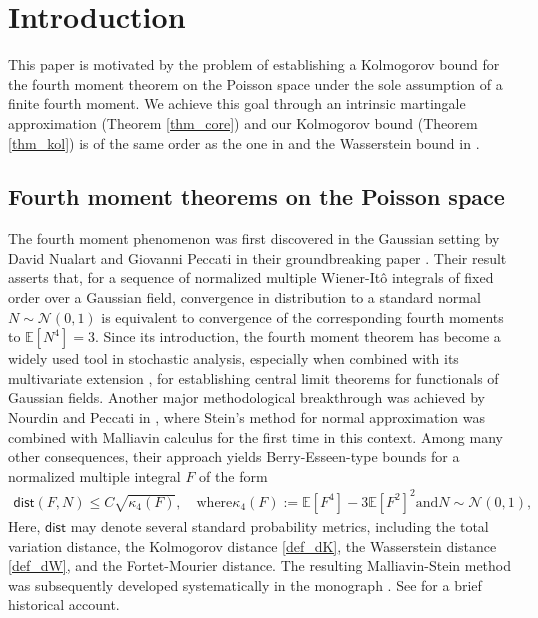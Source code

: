 \documentclass[ECP,preprint]{ejpecp}
\newcommand{\E}{\mathbb{E}}
\newcommand{\NN}{\mathcal{N}}
\begin{document}
\section{Introduction}
\label{SEC1}

This paper is motivated by the problem of establishing a Kolmogorov bound 
for the fourth moment theorem on the Poisson space \cite{DP18,DVZ18} 
under the sole assumption of a finite fourth moment. 
We achieve this goal through an intrinsic martingale approximation (Theorem \ref{thm_core})
and our Kolmogorov bound (Theorem \ref{thm_kol}) is of the same order 
as the one in \cite{DP18} and the
 Wasserstein bound in \cite{DVZ18}.

\subsection{Fourth moment theorems on the Poisson space} \label{SEC_11}

The fourth moment phenomenon was first discovered in the Gaussian setting 
by David Nualart and Giovanni Peccati in their groundbreaking paper \cite{FMT}. 
Their result asserts that, for a sequence of normalized multiple Wiener-It\^o integrals 
of fixed order over a Gaussian field, 
convergence in distribution to a standard normal   
$N\sim\NN(0,1)$ is equivalent to convergence of 
the corresponding fourth moments to
$
\E[N^4]=3.
$
Since its introduction, the fourth moment theorem 
has become a widely used tool in stochastic analysis, 
especially when combined with its multivariate extension \cite{PT05}, 
for establishing central limit theorems for functionals of Gaussian fields.
Another major methodological breakthrough was achieved by Nourdin and Peccati
in \cite{NP09}, where Stein's method for normal approximation 
was combined with Malliavin calculus for the first time in this context. 
Among many other consequences, their approach yields Berry-Esseen-type bounds 
for a normalized multiple integral $F$ of the form
\begin{align}\label{nota1}
\textsf{dist}(F,N)
\leq C\sqrt{\kappa_4(F)},
\quad
\text{where
$\kappa_4(F):=\E[F^4]-3\E[F^2]^2$
and
$N\sim\NN(0,1)$,}
\end{align}
Here, $\textsf{dist}$ may denote several standard probability metrics, 
including 
the total variation distance, 
the Kolmogorov distance \eqref{def_dK}, 
the Wasserstein distance \eqref{def_dW}, 
and the Fortet-Mourier distance. 
The resulting Malliavin-Stein method was subsequently developed 
systematically in the monograph \cite{bluebook}.
See   \cite[Ch.~1]{Zheng18} for a brief historical account.
\end{document}

